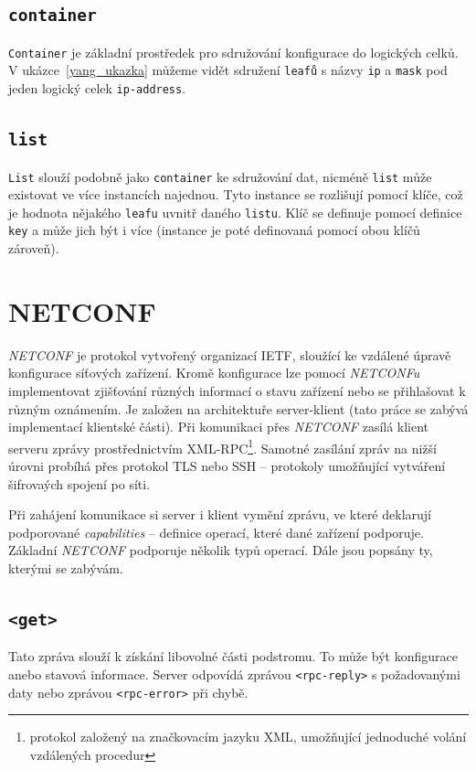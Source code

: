 \documentclass[thesis=B,czech,hidelinks]{FITthesis}[2019/03/06]
\begin{document}
\subsection{\texttt{container}}
\texttt{Container} je základní prostředek pro sdružování konfigurace do logických celků. V ukázce~\ref{yang_ukazka} můžeme vidět sdružení \texttt{leafů} s názvy \texttt{ip} a \texttt{mask} pod jeden logický celek \texttt{ip-address}.
\subsection{\texttt{list}}
\texttt{List} slouží podobně jako \texttt{container} ke sdružování dat, nicméně \texttt{list} může existovat ve více instancích najednou. Tyto instance se rozlišují pomocí klíče, což je hodnota nějakého \texttt{leafu} uvnitř daného \texttt{listu}. Klíč se definuje pomocí definice \texttt{key} a může jich být i více (instance je poté definovaná pomocí obou klíčů zároveň).


\section{NETCONF}
\textit{NETCONF} je protokol vytvořený organizací IETF, sloužící ke vzdálené úpravě konfigurace síťových zařízení. Kromě konfigurace lze pomocí \textit{NETCONFu} implementovat zjišťování různých informací o stavu zařízení nebo se přihlašovat k různým oznámením. Je založen na architektuře server-klient (tato práce se zabývá implementací klientské části). Při komunikaci přes \textit{NETCONF} zasílá klient serveru zprávy prostřednictvím XML-RPC\footnote{protokol založený na značkovacím jazyku XML, umožňující jednoduché volání vzdálených procedur}. Samotné zasílání zpráv na nižší úrovni probíhá přes protokol TLS nebo SSH -- protokoly umožňující vytváření šifrovaých spojení po síti.

Při zahájení komunikace si server i klient vymění  zprávu, ve které deklarují podporované \textit{capabilities} -- definice operací, které dané zařízení podporuje. Základní \textit{NETCONF} podporuje několik typů operací. Dále jsou popsány ty, kterými se zabývám.

\subsection{\texttt{<get>}}
Tato zpráva slouží k získání libovolné části podstromu. To může být konfigurace anebo stavová informace. Server odpovídá zprávou \texttt{<rpc-reply>} s požadovanými daty nebo zprávou \texttt{<rpc-error>} při chybě.
\end{document}
